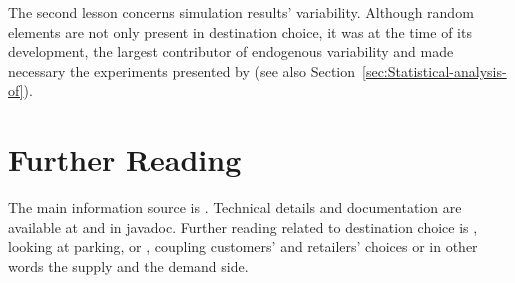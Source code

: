 The second lesson concerns simulation results' variability. 
Although random elements are not only present in destination choice, it was at the time of its development, the largest contributor of endogenous variability and made necessary the experiments presented by \citet[][]{HorniEtAl_TechRep_IVT_2011_b} (see also Section~\ref{sec:Statistical-analysis-of}).

\section{Further Reading}
The main information source is \citet[][]{HorniEtAl_unpub_TRB_2012, Horni_PhDThesis_2013}. 
Technical details and documentation are available at \citet[][]{MATSIM-DC_Webpage_2015} and in \gls{javadoc}. 
Further reading related to destination choice is \citet[][]{HorniEtAl_IATBRspec_2013}, looking at parking, or \citet[][]{HorniEtAl_TechRep_IVT_2012}, coupling customers' and retailers' choices or in other words the supply and the demand side.

